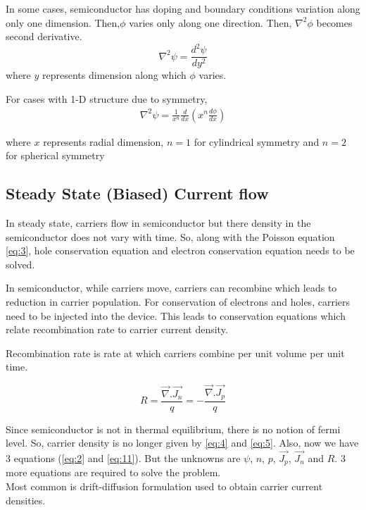 In some cases, semiconductor has doping and boundary conditions variation along only one dimension. Then,$\phi$ varies only along one direction. Then, $\nabla^2 \phi$ becomes second derivative. 
\begin{equation}
\nabla^2 \psi = \frac{d^2\psi}{dy^2}  \tag{1.9} \label{eq:9}
\end{equation}
where $y$ represents dimension along which $\phi$ varies.

For cases with 1-D structure due to symmetry,
\begin{align*}
	\nabla^2 \psi = \frac{1}{x^n} \frac{d}{dx}\left( x^n\frac{d\phi}{dx} \right)
\end{align*}

where $x$ represents radial dimension, $n=1$ for cylindrical symmetry and $n=2$ for spherical symmetry 

\subsection{Steady State (Biased) Current flow}

In steady state, carriers flow in semiconductor but there density in the semiconductor does not vary with time.
So, along with the Poisson equation \eqref{eq:3}, hole conservation equation and electron conservation equation needs to be solved.

In semiconductor, while carriers move, carriers can recombine which leads to reduction in carrier population. For conservation of electrons and holes, carriers need to be injected into the device. This leads to conservation equations which relate recombination rate to carrier current density.

Recombination rate is rate at which carriers combine per unit volume per unit time.

\begin{equation}
R =  \frac{\vec{\nabla}.\vec{J_n}}{q} =-\frac{\vec{\nabla}.\vec{J_p}}{q}   \tag{1.10} \label{eq:10}
\end{equation}

Since semiconductor is not in thermal equilibrium, there is no notion of fermi level. So, carrier density is no longer given by \eqref{eq:4} and \eqref{eq:5}. Also, now we have 3 equations (\eqref{eq:2} and \eqref{eq:11}). But the unknowns are $\psi$, $n$, $p$, $\vec{J_p}$, $\vec{J_n}$ and $R$. 3 more equations are required to solve the problem.\\

Most common is drift-diffusion formulation used to obtain carrier current densities.

